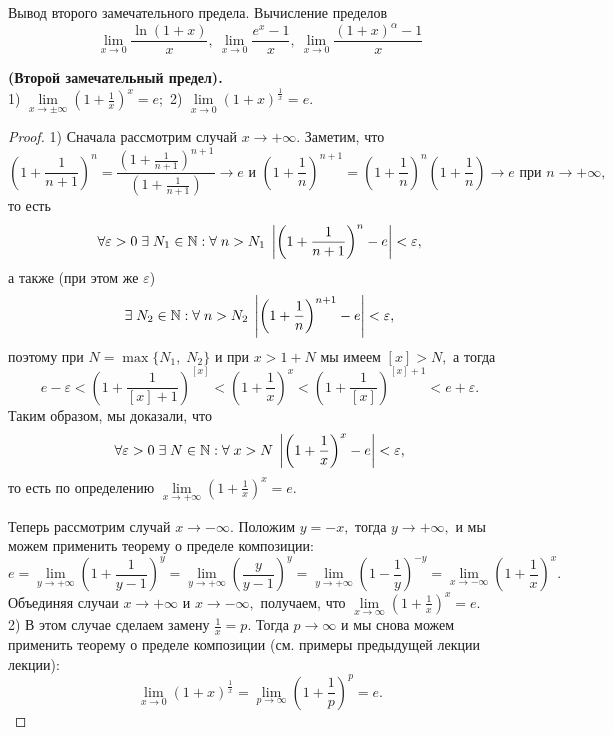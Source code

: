 \newpage
\begin{problem}
Вывод второго замечательного предела. Вычисление пределов
\begin{equation}
    \lim_{x\to0} \frac{\ln(1+x)}{x},\:\lim_{x\to0} \frac{e^x - 1}{x},\:\lim_{x\to0} \frac{(1+x)^\alpha - 1}{x}
\end{equation}
\end{problem}

\begin{proposition}
    \textbf{(Второй замечательный предел).}\\
    1) $\lim\limits_{x\rightarrow\pm\infty}
        \left(1+\frac{1}{x}\right)^x=e;$
    2) $\lim\limits_{x\rightarrow0}
        (1+x)^{\frac{1}{x}}=e.$
\end{proposition}
\begin{proof}
    1) Сначала рассмотрим случай
    $x\rightarrow+\infty.$
    Заметим, что
    $$
        \left(1+\frac{1}{n+1}\right)^n=
        \frac{\left(1+\frac{1}{n+1}\right)^{n+1}}
        {\left(1+\frac{1}{n+1}\right)}\rightarrow e \textrm{ и }
        \left(1+\frac{1}{n}\right)^{n+1}=
        \left(1+\frac{1}{n}\right)^n
        \left(1+\frac{1}{n}\right)\rightarrow e
        \textrm{ при } n\rightarrow+\infty,
    $$
    то есть
    $$
        \forall\varepsilon>0\;\exists\;N_1\in\mathbb{N}:
        \forall\;n>N_1\;\left|\left(1+\frac{1}{n+1}\right)^n
        -e\right|<\varepsilon,
    $$
    а также (при этом же $\varepsilon$)
    $$
        \exists\;N_2\in\mathbb{N}:
        \forall\;n>N_2\;\left|\left(1+\frac{1}{n}\right)^{n+1}
        -e\right|<\varepsilon,
    $$
    поэтому при $N=\max\{N_1,\;N_2\}$
    и при $x>1+N$ мы имеем $[x]>N,$
    а тогда
    $$
        e-\varepsilon
        <\left(1+\frac{1}{[x]+1}\right)^{[x]}
        <\left(1+\frac{1}{x}\right)^{x}
        <\left(1+\frac{1}{[x]}\right)^{[x]+1}
        <e+\varepsilon.
    $$
    Таким образом, мы доказали, что
    $$
        \forall\varepsilon>0\;\exists\;N\in\mathbb{N}:
        \forall\;x>N\;\left|\left(1+\frac{1}{x}\right)^x
        -e\right|<\varepsilon,
    $$
    то есть по определению
    $\lim\limits_{x\rightarrow+\infty}
        \left(1+\frac{1}{x}\right)^x=e.$

    Теперь рассмотрим случай $x\rightarrow-\infty.$
    Положим $y=-x,$ тогда
    $y\rightarrow+\infty,$ и мы можем применить
    теорему о пределе композиции:
    $$
        e=\lim\limits_{y\rightarrow+\infty}
        \left(1+\frac{1}{y-1}\right)^y=
        \lim\limits_{y\rightarrow+\infty}
        \left(\frac{y}{y-1}\right)^y=
        \lim\limits_{y\rightarrow+\infty}
        \left(1-\frac{1}{y}\right)^{-y}=
        \lim\limits_{x\rightarrow-\infty}
        \left(1+\frac{1}{x}\right)^x.
    $$
    Объединяя случаи $x\rightarrow+\infty$
    и $x\rightarrow-\infty,$
    получаем, что
    $\lim\limits_{x\rightarrow\infty}
        \left(1+\frac{1}{x}\right)^x=e.$\\
    2) В этом случае сделаем замену
    $\frac{1}{x}=p.$ Тогда $p\rightarrow\infty$
    и мы снова можем применить теорему о
    пределе композиции
    (см. примеры предыдущей лекции
    лекции):
    $$
        \lim\limits_{x\rightarrow0}
        (1+x)^\frac{1}{x}=
        \lim\limits_{p\rightarrow\infty}
        \left(1+\frac{1}{p}\right)^p=e.
    $$
\end{proof}

